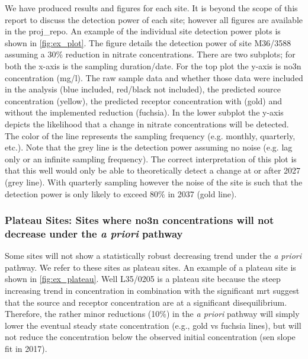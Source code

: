 We have produced results and figures for each site. It is beyond the scope of this report to discuss the detection power of each site; however all figures are available in the \gls{proj_repo}. An example of the individual site detection power plots is shown in \autoref{fig:ex_plot}. The figure details the detection power of site M36/3588 assuming a 30\% reduction in nitrate concentrations. There are two subplots; for both the x-axis is the sampling duration/date. For the top plot the y-axis is \gls{no3n} concentration (mg/l). The raw sample data and whether those data were included in the analysis (blue included, red/black not included), the predicted source concentration (yellow), the predicted receptor concentration with (gold) and without the implemented reduction (fuchsia). In the lower subplot the y-axis depicts the likelihood that a change in nitrate concentrations will be detected. The color of the line represents the sampling frequency (e.g. monthly, quarterly, etc.). Note that the grey line is the detection power assuming no noise (e.g. lag only or an infinite sampling frequency). The correct interpretation of this plot is that this well would only be able to theoretically detect a change at or after 2027 (grey line). With quarterly sampling however the noise of the site is such that the detection power is only likely to exceed 80\% in 2037 (gold line).


\subsubsection[Plateau Sites]{Plateau Sites: Sites where \gls{no3n} concentrations will not decrease under the \textit{a priori} pathway} \label{sec:plateau_results}

Some sites will not show a statistically robust decreasing trend under the \textit{a priori} pathway. We refer to these sites as plateau sites. An example of a plateau site is shown in \autoref{fig:ex_plateau}. Well L35/0205 is a plateau site because the steep increasing trend in concentration in combination with the significant \gls{mrt} suggest that the source and receptor concentration are at a significant disequilibrium. Therefore, the rather minor reductions (10\%) in the \textit{a priori} pathway will simply lower the eventual steady state concentration (e.g., gold vs fuchsia lines), but will not reduce the concentration below the observed initial concentration (sen slope fit in 2017).

